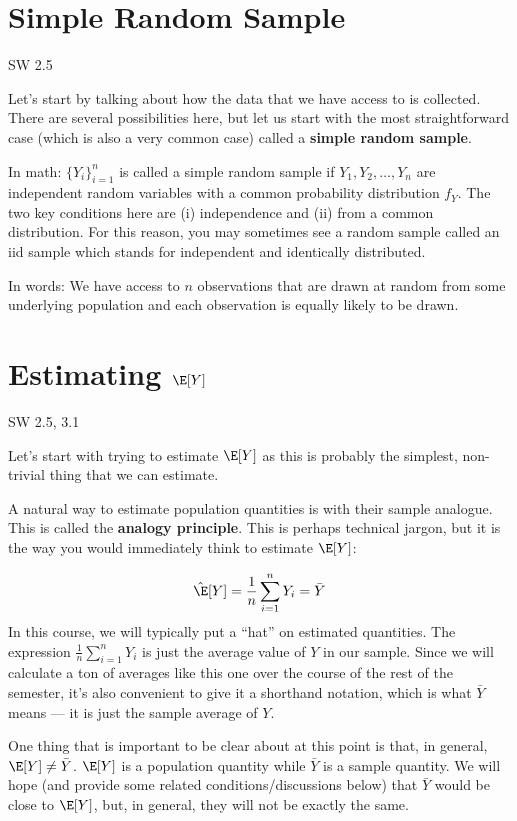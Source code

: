 \documentclass[
  letterpaper,
  DIV=11,
  numbers=noendperiod]{scrreprt}
\begin{document}
\section{Simple Random Sample}\label{simple-random-sample}

SW 2.5

Let's start by talking about how the data that we have access to is
collected. There are several possibilities here, but let us start with
the most straightforward case (which is also a very common case) called
a \textbf{simple random sample}.

In math: \(\{Y_i\}_{i=1}^n\) is called a simple random sample if
\(Y_1, Y_2, \ldots, Y_n\) are independent random variables with a common
probability distribution \(f_Y\). The two key conditions here are (i)
independence and (ii) from a common distribution. For this reason, you
may sometimes see a random sample called an iid sample which stands for
independent and identically distributed.

In words: We have access to \(n\) observations that are drawn at random
from some underlying population and each observation is equally likely
to be drawn.

\section{\texorpdfstring{Estimating
\(\E[Y]\)}{Estimating \textbackslash E{[}Y{]}}}\label{estimating-ey}

SW 2.5, 3.1

Let's start with trying to estimate \(\E[Y]\) as this is probably the
simplest, non-trivial thing that we can estimate.

A natural way to estimate population quantities is with their sample
analogue. This is called the \textbf{analogy principle}. This is perhaps
technical jargon, but it is the way you would immediately think to
estimate \(\E[Y]\):

\[
  \hat{\E}[Y] = \frac{1}{n} \sum_{i=1}^n Y_i = \bar{Y}
\] In this course, we will typically put a ``hat'' on estimated
quantities. The expression \(\displaystyle \frac{1}{n}\sum_{i=1}^n Y_i\)
is just the average value of \(Y\) in our sample. Since we will
calculate a ton of averages like this one over the course of the rest of
the semester, it's also convenient to give it a shorthand notation,
which is what \(\bar{Y}\) means --- it is just the sample average of
\(Y\).

One thing that is important to be clear about at this point is that, in
general, \(\E[Y] \neq \bar{Y}\). \(\E[Y]\) is a population quantity
while \(\bar{Y}\) is a sample quantity. We will hope (and provide some
related conditions/discussions below) that \(\bar{Y}\) would be close to
\(\E[Y]\), but, in general, they will not be exactly the same.
\end{document}
